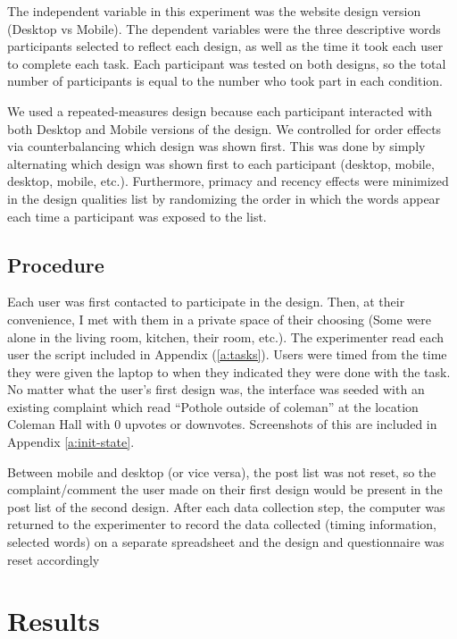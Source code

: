 \documentclass{article}
\begin{document}
The independent variable in this experiment was the website design version (Desktop vs Mobile). The dependent variables were the three descriptive words participants selected to reflect each design, as well as the time it took each user to complete each task. Each participant was tested on both designs, so the total number of participants is equal to the number who took part in each condition. 

We used a repeated-measures design because each participant interacted with both Desktop and Mobile versions of the design. We controlled for order effects via counterbalancing which design was shown first. This was done by simply alternating which design was shown first to each participant (desktop, mobile, desktop, mobile, etc.). Furthermore, primacy and recency effects were minimized in the design qualities list by randomizing the order in which the words appear each time a participant was exposed to the list. 

\subsection{Procedure}

Each user was first contacted to participate in the design. Then, at their convenience, I met with them in a private space of their choosing (Some were alone in the living room, kitchen, their room, etc.). The experimenter read each user the script included in Appendix (\autoref{a:tasks}). Users were timed from the time they were given the laptop to when they indicated they were done with the task. No matter what the user’s first design was, the interface was seeded with an existing complaint which read “Pothole outside of coleman” at the location Coleman Hall with 0 upvotes or downvotes. Screenshots of this are included in Appendix \autoref{a:init-state}. 

Between mobile and desktop (or vice versa), the post list was not reset, so the complaint/comment the user made on their first design would be present in the post list of the second design. After each data collection step, the computer was returned to the experimenter to record the data collected (timing information, selected words) on a separate spreadsheet and the design and questionnaire was reset accordingly

\newpage

\section{Results}
\end{document}
